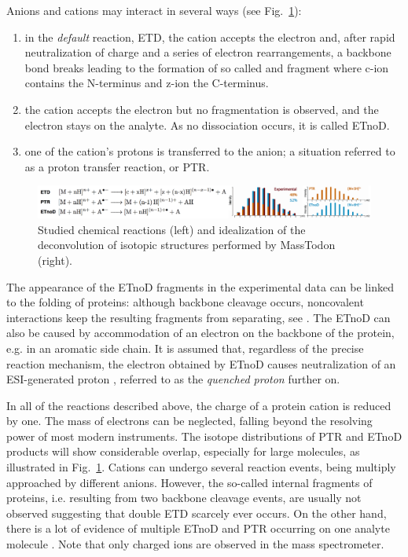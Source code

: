 \documentclass{llncs}
\begin{document}
Anions and cations may interact in several ways (see Fig.~\ref{img::reactionsMassTodon}):
\begin{enumerate}
        \item in the \textit{default} reaction, ETD, the cation accepts the electron and, after rapid neutralization of charge and a series of electron rearrangements, a backbone  bond breaks leading to the formation of so called  and  fragment where c-ion contains the N-terminus and z-ion the C-terminus.

        \item the cation accepts the electron but no fragmentation is observed, and the electron stays on the analyte. As no dissociation occurs, it is called ETnoD.

        \item one of the cation’s protons is transferred to the anion; a situation referred to as a proton transfer reaction, or PTR.
\end{enumerate}
\begin{figure}[h]\centering
        \includegraphics[width=1.1\textwidth]{reactionMassTodon.png}
        \caption{Studied chemical reactions (left) and
        idealization of the deconvolution of isotopic structures performed by {\sc MassTodon} (right).}\label{img::reactionsMassTodon}
\end{figure}

The appearance of the ETnoD fragments in the experimental data can be linked to the folding of proteins: although backbone cleavage occurs, noncovalent interactions keep the resulting fragments from separating, see \cite{Lermyte2014-vu,Lermyte2015-oy}. The ETnoD can also be caused by accommodation of an electron on the backbone of the protein, e.g. in an aromatic side chain. It is assumed that, regardless of the precise reaction mechanism, the electron obtained by ETnoD causes neutralization of an ESI-generated proton \cite{Lermyte2015-lm}, referred to as the \textit{quenched proton} further on.

In all of the reactions described above, the charge of a protein cation is reduced by one. The mass of electrons can be neglected, falling beyond the resolving power of most modern instruments. The isotope distributions of PTR and ETnoD products will show considerable overlap, especially for large molecules, as illustrated in Fig.~\ref{img::reactionsMassTodon}. Cations can undergo several reaction events, being multiply approached by different anions. However, the so-called internal fragments of proteins, i.e. resulting from two backbone cleavage events, are usually not observed suggesting that double ETD scarcely ever occurs. On the other hand, there is a lot of evidence of multiple ETnoD and PTR occurring on one analyte molecule  \cite{Lermyte2015-li}. Note that only charged ions are observed in the mass spectrometer.
\end{document}
